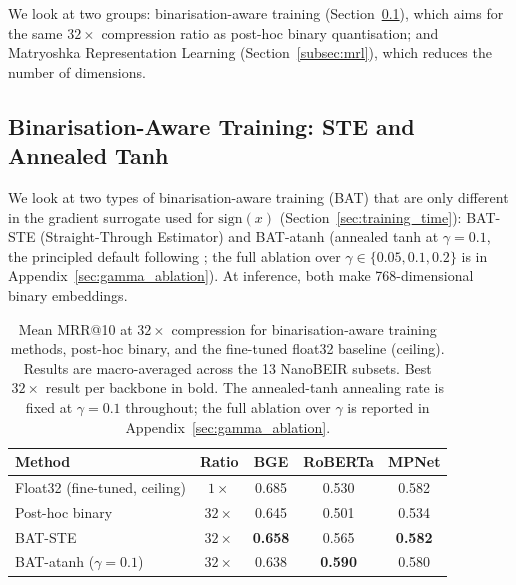 We look at two groups: binarisation-aware training
(Section~\ref{subsec:ste_atanh}), which aims for the same $32\times$
compression ratio as post-hoc binary quantisation; and Matryoshka
Representation Learning (Section~\ref{subsec:mrl}), which reduces the
number of dimensions.

\subsection{Binarisation-Aware Training: STE and Annealed Tanh}
\label{subsec:ste_atanh}

We look at two types of binarisation-aware training (BAT) that are only
different in the gradient surrogate used for $\mathrm{sign}(x)$
(Section~\ref{sec:training_time}): BAT-STE (Straight-Through Estimator)
and BAT-atanh (annealed tanh at $\gamma = 0.1$, the principled default
following \cite{yamada2021efficient}; the full ablation over $\gamma \in
\{0.05, 0.1, 0.2\}$ is in Appendix~\ref{sec:gamma_ablation}). At
inference, both make 768-dimensional binary embeddings.

\begin{table}[H]
  \centering
  \caption[Binarisation-aware training vs post-hoc binary at $32\times$.]{Mean MRR@10 at $32\times$ compression for binarisation-aware training methods, post-hoc binary, and the fine-tuned float32 baseline (ceiling). Results are macro-averaged across the 13 NanoBEIR subsets. Best $32\times$ result per backbone in bold. The annealed-tanh annealing rate is fixed at $\gamma=0.1$ throughout; the full ablation over $\gamma$ is reported in Appendix~\ref{sec:gamma_ablation}.}
  \label{tab:ste_atanh}
  \begin{tabular}{| l | c | c | c | c |}
    \hline
    \textbf{Method} & \textbf{Ratio} & \textbf{BGE} & \textbf{RoBERTa} & \textbf{MPNet} \\ [0.5ex] \hline
    Float32 (fine-tuned, ceiling) & $1\times$  & 0.685          & 0.530          & 0.582          \\ \hline
    Post-hoc binary               & $32\times$ & 0.645          & 0.501          & 0.534          \\ \hline
    BAT-STE                       & $32\times$ & \textbf{0.658} & 0.565          & \textbf{0.582} \\ \hline
    BAT-atanh ($\gamma=0.1$)      & $32\times$ & 0.638          & \textbf{0.590} & 0.580          \\ \hline
  \end{tabular}
\end{table}

